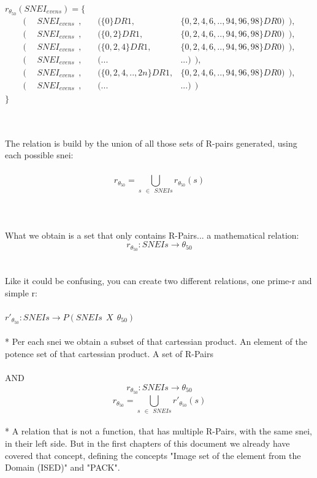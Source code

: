 	\noindent
	$r_{\theta_{50}} ( SNEI_{evens} )  = \{$
	\begin{align*}
		(\:\:& SNEI_{evens}\:\:,      \:\:\:\:\:\:\:\:(\{0\}DR1,	             &\{0, 2, 4, 6, .. , 94, 96, 98\}DR0)\:\:), \\
		(\:\:& SNEI_{evens}\:\:,      \:\:\:\:\:\:\:\:(\{0,2\}DR1,	             &\{0, 2, 4, 6, .. , 94, 96, 98\}DR0)\:\:), \\
		(\:\:& SNEI_{evens}\:\:,      \:\:\:\:\:\:\:\:(\{0,2,4\}DR1,	         &\{0, 2, 4, 6, .. , 94, 96, 98\}DR0)\:\:), \\
		(\:\:& SNEI_{evens}\:\:,      \:\:\:\:\:\:\:\:(...                       &... )\:\:),                               \\
		(\:\:& SNEI_{evens}\:\:,      \:\:\:\:\:\:\:\:(\{0,2,4,.., 2n\}DR1,      &\{0, 2, 4, 6, .. , 94, 96, 98\}DR0)\:\:), \\	 
		(\:\:& SNEI_{evens}\:\:,      \:\:\:\:\:\:\:\:(...                       &... )\:\:)                                 		  
	\end{align*}
	$\}$\\
	\\\\
	
	\newpage
	
	\noindent
	The relation is build by the union of all those sets of R-pairs generated, using each possible snei:\\\\
	\[ r_{\theta_{50}} = \bigcup_{s \:\: \in \:\: SNEIs}^{} r_{\theta_{50}}(s) \] \\
	\\\\
	
	\noindent
	What we obtain is a set that only contains R-Pairs... a mathematical relation:\\
	$$ r_{\theta_{50}}: SNEIs \rightarrow \theta_{50} $$
	\\\\
	
	\noindent
	Like it could be confusing, you can create two different relations, one prime-r and simple r:\\\\
	$r'_{\theta_{50}}: SNEIs \rightarrow P(SNEIs \:\:X\:\: \theta_{50})$ \\\\
	* Per each snei we obtain a subset of that cartessian product. An element of the potence set of that cartessian product. A set of R-Pairs\\\\
	AND\\
	$$r_{\theta_{50}}: SNEIs \rightarrow \theta_{50}$$
	\[ r_{\theta_{50}} = \bigcup_{s \:\: \in \:\: SNEIs}^{} r'_{\theta_{50}}(s) \] \\
	* A relation that is not a function, that has multiple R-Pairs, with the same snei, in their left side. But in the first chapters of this document we already have covered that concept, defining the concepts "Image set of the element from the Domain (ISED)" and "PACK".
	\\\\
	
